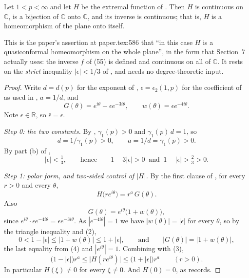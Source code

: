 \begin{lemma}
Let $1<p<\infty$ and let $H$ be the extremal function of .
Then $H$ is continuous on $\mathbb{C}$, is a bijection of $\mathbb{C}$ onto
$\mathbb{C}$, and its inverse is continuous; that is, $H$ is a homeomorphism of
the plane onto itself.

This is the paper's assertion at paper.tex:586 that ``in this case $H$ is a
quasiconformal homeomorphism on the whole plane'', in the form that Section~7
actually uses: the inverse $f$ of (55) is defined and continuous on all of
$\mathbb{C}$.  It rests on the \emph{strict} inequality $|\epsilon|<1/3$ of
, and needs no degree-theoretic input.
\end{lemma}
\begin{proof}
Write $d=d(p)$ for the exponent of ,
$\epsilon=\epsilon_2(1,p)$ for the coefficient of  as used in
, $a=1/d$, and
\[
  G(\theta)=e^{i\theta}+\epsilon e^{-3i\theta},\qquad
  w(\theta)=\epsilon e^{-4i\theta}.
\]
Note $\epsilon\in\mathbb{R}$, so $\bar\epsilon=\epsilon$.

\emph{Step 0: the two constants.}  By ,
$\gamma_1(p)>0$ and $\gamma_1(p)\,d=1$, so
\begin{equation}\tag{1}
  d=1/\gamma_1(p)>0,\qquad a=1/d=\gamma_1(p)>0 .
\end{equation}
By part (b) of ,
\begin{equation}\tag{2}
  |\epsilon|<\tfrac13,\qquad\text{hence}\qquad
  1-3|\epsilon|>0\ \text{ and }\ 1-|\epsilon|>\tfrac23>0 .
\end{equation}

\emph{Step 1: polar form, and two-sided control of $|H|$.}  By the first clause
of , for every $r>0$ and every $\theta$,
\begin{equation}\tag{3}
  H\bigl(re^{i\theta}\bigr)=r^{a}\,G(\theta).
\end{equation}
Also
\begin{equation}\tag{4}
  G(\theta)=e^{i\theta}\bigl(1+w(\theta)\bigr),
\end{equation}
since $e^{i\theta}\cdot\epsilon e^{-4i\theta}=\epsilon e^{-3i\theta}$.  As
$|e^{-4i\theta}|=1$ we have $|w(\theta)|=|\epsilon|$ for every $\theta$, so by
the triangle inequality and (2),
\begin{equation}\tag{5}
  0<1-|\epsilon|\le\bigl|1+w(\theta)\bigr|\le1+|\epsilon|,
  \qquad\text{and}\qquad |G(\theta)|=\bigl|1+w(\theta)\bigr| ,
\end{equation}
the last equality from (4) and $|e^{i\theta}|=1$.  Combining with (3),
\begin{equation}\tag{6}
  \bigl(1-|\epsilon|\bigr)r^{a}\le\bigl|H(re^{i\theta})\bigr|
  \le\bigl(1+|\epsilon|\bigr)r^{a}\qquad(r>0).
\end{equation}
In particular $H(\xi)\neq0$ for every $\xi\neq0$.  And $H(0)=0$, as
 records.


\end{proof}
